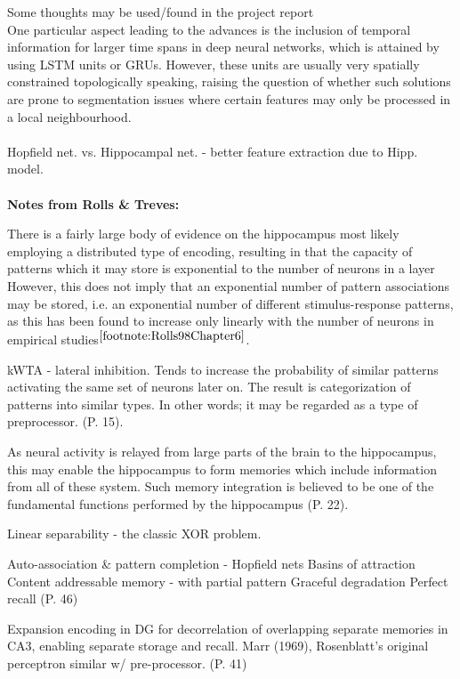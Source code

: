 Some thoughts may be used/found in the project report
\\

One particular aspect leading to the advances is the inclusion of temporal information for larger time spans in deep neural networks, which is attained by using LSTM units or GRUs. However, these units are usually very spatially constrained topologically speaking, raising the question of whether such solutions are prone to segmentation issues where certain features may only be processed in a local neighbourhood.
\\\\

Hopfield net. vs. Hippocampal net. - better feature extraction due to Hipp. model.
\\\\

\textbf{Notes from Rolls \& Treves:}

There is a fairly large body of evidence on the hippocampus most likely employing a distributed type of encoding, resulting in that the capacity of patterns which it may store is exponential to the number of neurons in a layer
However, this does not imply that an exponential number of pattern associations may be stored, i.e. an exponential number of different stimulus-response patterns, as this has been found to increase only linearly with the number of neurons in empirical studies$^{\ref{footnote:Rolls98Chapter6}}$.

kWTA - lateral inhibition. Tends to increase the probability of similar patterns activating the same set of neurons later on. The result is categorization of patterns into similar types. In other words; it may be regarded as a type of preprocessor. (P. 15).

As neural activity is relayed from large parts of the brain to the hippocampus, this may enable the hippocampus to form memories which include information from all of these system. Such memory integration is believed to be one of the fundamental functions performed by the hippocampus (P. 22).

Linear separability - the classic XOR problem.

Auto-association \& pattern completion - Hopfield nets
Basins of attraction
Content addressable memory - with partial pattern
Graceful degradation
Perfect recall (P. 46)

Expansion encoding in DG for decorrelation of overlapping separate memories in CA3, enabling separate storage and recall. Marr (1969), Rosenblatt's original perceptron similar w/ pre-processor. (P. 41)

